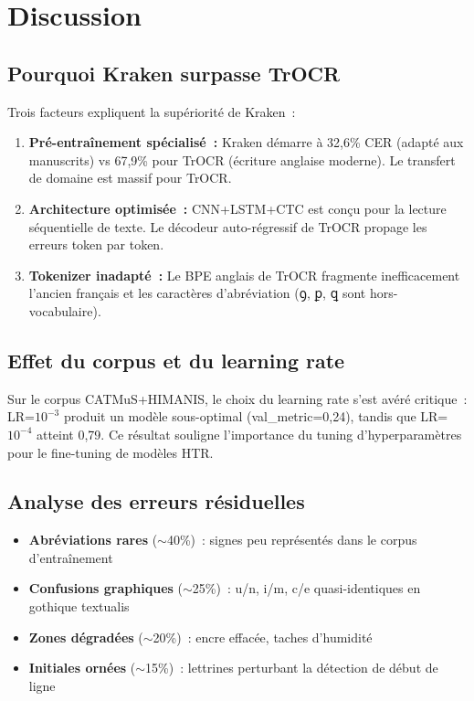 \documentclass[11pt,a4paper]{article}
\begin{document}
\section{Discussion}

\subsection{Pourquoi Kraken surpasse TrOCR}

Trois facteurs expliquent la supériorité de Kraken~:
\begin{enumerate}[leftmargin=*, itemsep=2pt]
\item \textbf{Pré-entraînement spécialisé~:} Kraken démarre à 32,6\% CER (adapté aux manuscrits) vs 67,9\% pour TrOCR (écriture anglaise moderne). Le transfert de domaine est massif pour TrOCR.
\item \textbf{Architecture optimisée~:} CNN+LSTM+CTC est conçu pour la lecture séquentielle de texte. Le décodeur auto-régressif de TrOCR propage les erreurs token par token.
\item \textbf{Tokenizer inadapté~:} Le BPE anglais de TrOCR fragmente inefficacement l'ancien français et les caractères d'abréviation (ꝯ, ꝑ, ꝗ sont hors-vocabulaire).
\end{enumerate}

\subsection{Effet du corpus et du learning rate}

Sur le corpus CATMuS+HIMANIS, le choix du learning rate s'est avéré critique~: LR=$10^{-3}$ produit un modèle sous-optimal (val\_metric=0,24), tandis que LR=$10^{-4}$ atteint 0,79. Ce résultat souligne l'importance du tuning d'hyperparamètres pour le fine-tuning de modèles HTR.

\subsection{Analyse des erreurs résiduelles}

\begin{itemize}[leftmargin=*, itemsep=2pt]
\item \textbf{Abréviations rares} ($\sim$40\%)~: signes peu représentés dans le corpus d'entraînement
\item \textbf{Confusions graphiques} ($\sim$25\%)~: u/n, i/m, c/e quasi-identiques en gothique textualis
\item \textbf{Zones dégradées} ($\sim$20\%)~: encre effacée, taches d'humidité
\item \textbf{Initiales ornées} ($\sim$15\%)~: lettrines perturbant la détection de début de ligne
\end{itemize}
\end{document}
